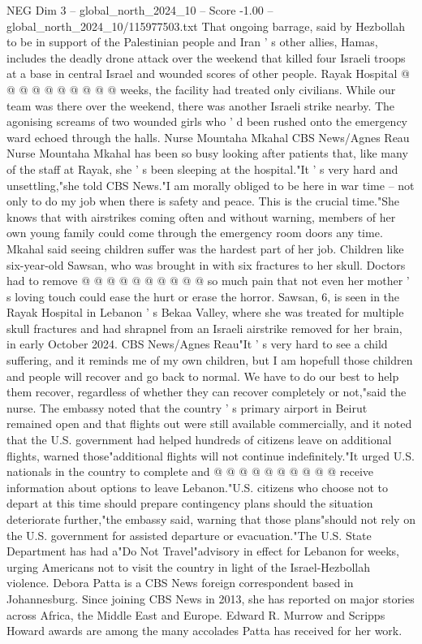 \begin{textsample}{NEG Dim 3 – global\_north\_2024\_10 – Score -1.00 – global\_north\_2024\_10/115977503.txt}
That ongoing barrage, said by Hezbollah to be in support of the Palestinian people and Iran ' s other allies, Hamas, includes the deadly drone attack over the weekend that killed four Israeli troops at a base in central Israel and wounded scores of other people.
Rayak Hospital @ @ @ @ @ @ @ @ @ @ weeks, the facility had treated only civilians.
While our team was there over the weekend, there was another Israeli strike nearby.
The agonising screams of two wounded girls who ' d been rushed onto the emergency ward echoed through the halls.
Nurse Mountaha Mkahal CBS News/Agnes Reau Nurse Mountaha Mkahal has been so busy looking after patients that, like many of the staff at Rayak, she ' s been sleeping at the hospital."It ' s very hard and unsettling,"she told CBS News."I am morally obliged to be here in war time -- not only to do my job when there is safety and peace.
This is the crucial time."She knows that with airstrikes coming often and without warning, members of her own young family could come through the emergency room doors any time.
Mkahal said seeing children suffer was the hardest part of her job.
Children like six-year-old Sawsan, who was brought in with six fractures to her skull.
Doctors had to remove @ @ @ @ @ @ @ @ @ @ so much pain that not even her mother ' s loving touch could ease the hurt or erase the horror.
Sawsan, 6, is seen in the Rayak Hospital in Lebanon ' s Bekaa Valley, where she was treated for multiple skull fractures and had shrapnel from an Israeli airstrike removed for her brain, in early October 2024.
CBS News/Agnes Reau"It ' s very hard to see a child suffering, and it reminds me of my own children, but I am hopefull those children and people will recover and go back to normal.
We have to do our best to help them recover, regardless of whether they can recover completely or not,"said the nurse.
The embassy noted that the country ' s primary airport in Beirut remained open and that flights out were still available commercially, and it noted that the U.S. government had helped hundreds of citizens leave on additional flights, warned those"additional flights will not continue indefinitely."It urged U.S. nationals in the country to complete and @ @ @ @ @ @ @ @ @ @ receive information about options to leave Lebanon."U.S. citizens who choose not to depart at this time should prepare contingency plans should the situation deteriorate further,"the embassy said, warning that those plans"should not rely on the U.S. government for assisted departure or evacuation."The U.S.
State Department has had a"Do Not Travel"advisory in effect for Lebanon for weeks, urging Americans not to visit the country in light of the Israel-Hezbollah violence.
Debora Patta is a CBS News foreign correspondent based in Johannesburg.
Since joining CBS News in 2013, she has reported on major stories across Africa, the Middle East and Europe.
Edward R.
Murrow and Scripps Howard awards are among the many accolades Patta has received for her work.

\end{textsample}
